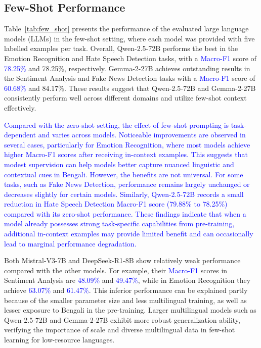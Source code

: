 \documentclass[10pt,letterpaper]{article}
\newcommand{\rev}[1]{\textcolor{blue}{#1}}
\begin{document}
\subsection*{Few-Shot Performance}
\label{sec:few_shot}


Table~\ref{tab:few_shot} presents the performance of the evaluated large language models (LLMs) in the few-shot setting, where each model was provided with five labelled examples per task. Overall, Qwen-2.5-72B performs the best in the Emotion Recognition and Hate Speech Detection tasks, with a \rev{Macro-F1} score of \rev{78.25\%} and 78.25\%, respectively. Gemma-2-27B achieves outstanding results in the Sentiment Analysis and Fake News Detection tasks with a \rev{Macro-F1} score of \rev{60.68\%} and 84.17\%. These results suggest that Qwen-2.5-72B and Gemma-2-27B consistently perform well across different domains and utilize few-shot context effectively.

\rev{Compared with the zero-shot setting, the effect of few-shot prompting is task-dependent and varies across models. Noticeable improvements are observed in several cases, particularly for Emotion Recognition, where most models achieve higher Macro-F1 scores after receiving in-context examples. This suggests that modest supervision can help models better capture nuanced linguistic and contextual cues in Bengali. However, the benefits are not universal. For some tasks, such as Fake News Detection, performance remains largely unchanged or decreases slightly for certain models. Similarly, Qwen-2.5-72B records a small reduction in Hate Speech Detection Macro-F1 score (79.88\% to 78.25\%) compared with its zero-shot performance. These findings indicate that when a model already possesses strong task-specific capabilities from pre-training, additional in-context examples may provide limited benefit and can occasionally lead to marginal performance degradation.}

Both Mistral-V3-7B and DeepSeek-R1-8B show relatively weak performance compared with the other models. For example, their \rev{Macro-F1} scores in Sentiment Analysis are \rev{48.09\%} and \rev{49.47\%}, while in Emotion Recognition they achieve \rev{63.07\%} and \rev{61.47\%}. This inferior performance can be explained partly because of the smaller parameter size and less multilingual training, as well as lesser exposure to Bengali in the pre-training. Larger multilingual models such as Qwen-2.5-72B and Gemma-2-27B exhibit more robust generalization ability, verifying the importance of scale and diverse multilingual data in few-shot learning for low-resource languages.
\end{document}
